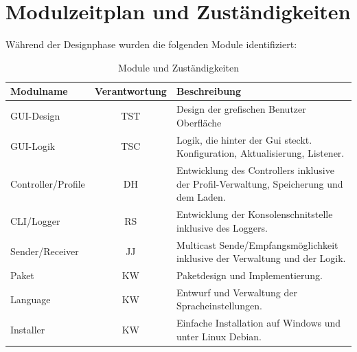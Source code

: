 \chapter{Modulzeitplan und Zuständigkeiten}
\label{cha:modu}
Während der Designphase wurden die folgenden Module identifiziert:

\begin{table}[h]
\caption{Module und Zuständigkeiten}
\label{tab:modz}
\begin{center}
\begin{tabular}{|l|c|p{8cm}|}
\hline
\textbf{Modulname} & \textbf{Verantwortung} & \textbf{Beschreibung}\\
\hline
GUI-Design & TST & Design der grefischen Benutzer Oberfläche\\
\hline
GUI-Logik & TSC & Logik, die hinter der Gui steckt. Konfiguration, Aktualisierung, Listener.\\
\hline
Controller/Profile & DH & Entwicklung des Controllers inklusive der Profil-Verwaltung, Speicherung und dem Laden.\\
\hline
CLI/Logger & RS & Entwicklung der Konsolenschnitstelle inklusive des Loggers.\\
\hline
Sender/Receiver & JJ & Multicast Sende/Empfangsmöglichkeit inklusive der Verwaltung und der Logik.\\
\hline
Paket & KW & Paketdesign und Implementierung.\\
\hline
Language & KW & Entwurf und Verwaltung der Spracheinstellungen.\\
\hline
Installer & KW & Einfache Installation auf Windows und unter Linux Debian.\\
\hline
\end{tabular}
\end{center}
\label{default}
\end{table}

\clearpage

